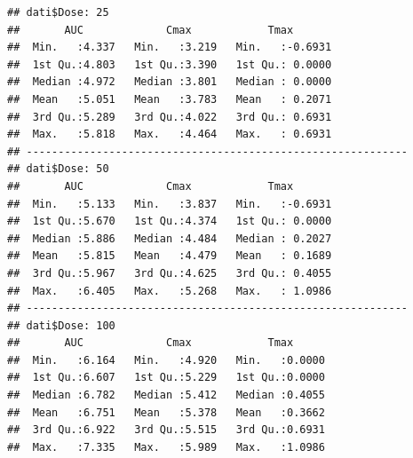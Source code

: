 \documentclass[
]{article}
\begin{document}
\begin{verbatim}
## dati$Dose: 25
##       AUC             Cmax            Tmax        
##  Min.   :4.337   Min.   :3.219   Min.   :-0.6931  
##  1st Qu.:4.803   1st Qu.:3.390   1st Qu.: 0.0000  
##  Median :4.972   Median :3.801   Median : 0.0000  
##  Mean   :5.051   Mean   :3.783   Mean   : 0.2071  
##  3rd Qu.:5.289   3rd Qu.:4.022   3rd Qu.: 0.6931  
##  Max.   :5.818   Max.   :4.464   Max.   : 0.6931  
## ------------------------------------------------------------ 
## dati$Dose: 50
##       AUC             Cmax            Tmax        
##  Min.   :5.133   Min.   :3.837   Min.   :-0.6931  
##  1st Qu.:5.670   1st Qu.:4.374   1st Qu.: 0.0000  
##  Median :5.886   Median :4.484   Median : 0.2027  
##  Mean   :5.815   Mean   :4.479   Mean   : 0.1689  
##  3rd Qu.:5.967   3rd Qu.:4.625   3rd Qu.: 0.4055  
##  Max.   :6.405   Max.   :5.268   Max.   : 1.0986  
## ------------------------------------------------------------ 
## dati$Dose: 100
##       AUC             Cmax            Tmax       
##  Min.   :6.164   Min.   :4.920   Min.   :0.0000  
##  1st Qu.:6.607   1st Qu.:5.229   1st Qu.:0.0000  
##  Median :6.782   Median :5.412   Median :0.4055  
##  Mean   :6.751   Mean   :5.378   Mean   :0.3662  
##  3rd Qu.:6.922   3rd Qu.:5.515   3rd Qu.:0.6931  
##  Max.   :7.335   Max.   :5.989   Max.   :1.0986
\end{verbatim}
\end{document}
